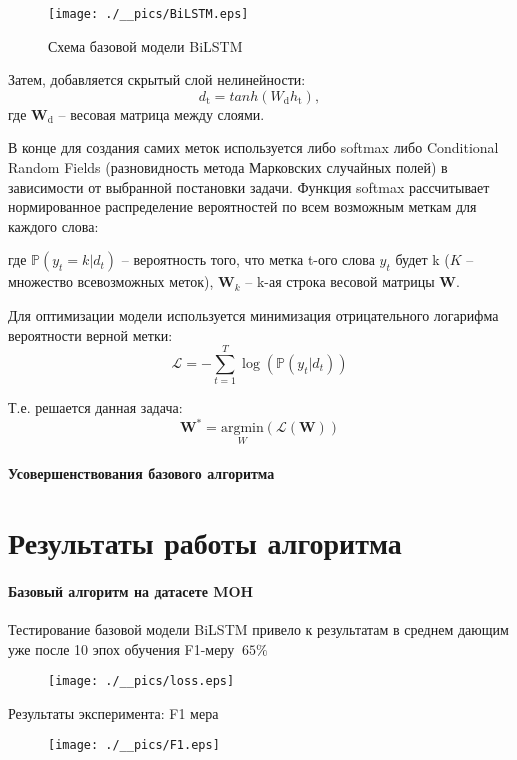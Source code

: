 \documentclass[12pt,twoside]{article}
\begin{document}
\begin{figure}[H]
	\centering
	\texttt{[image: ./\_\_pics/BiLSTM.eps]}
	\caption{Схема базовой модели BiLSTM}
\end{figure}

Затем, добавляется скрытый слой нелинейности:
$$d_\text{t} = tanh(W_\text{d}h_\text{t}),$$
где $\textbf{W}_\text{d}$ -- весовая матрица между слоями.

В конце для создания самих меток используется либо softmax либо Conditional Random Fields (разновидность метода Марковских случайных полей) в зависимости от выбранной постановки задачи. Функция softmax рассчитывает нормированное распределение вероятностей по всем возможным меткам для каждого слова:

где $\mathbb{P}(y_t = k| d_t)$ -- вероятность того, что метка t-ого слова $y_t$ будет k ($K$ -- множество всевозможных меток), $\textbf{W}_k$ -- k-ая строка весовой матрицы $\textbf{W}$. 

Для оптимизации модели используется минимизация отрицательного логарифма вероятности верной метки: 
$$\mathcal{L} = -\sum_{t=1}^{T}\log(\mathbb{P}(y_t|d_t))$$

Т.е. решается данная задача: 
$$\textbf{W}^* = \underset{W}{\text{argmin}}(\mathcal{L}(\textbf{W}))$$


\paragraph{Усовершенствования базового алгоритма} 

\newpage
\section{Результаты работы алгоритма}

\paragraph{Базовый алгоритм на датасете MOH}
Тестирование базовой модели BiLSTM привело к результатам в среднем дающим уже после 10 эпох обучения F1-меру $~65\%$
	\begin{figure}[H]
		\centering
		\texttt{[image: ./\_\_pics/loss.eps]}
	\end{figure}
Результаты эксперимента: F1 мера
	\begin{figure}[H]
		\centering
		\texttt{[image: ./\_\_pics/F1.eps]}
	\end{figure}
	
\end{document}
